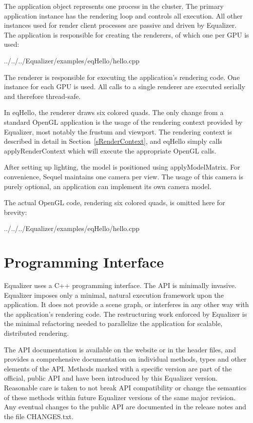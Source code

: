 \documentclass[10pt,a4]{scrartcl}
\newcommand{\sref}[1]{Section~\ref{#1}}
\begin{document}
The application object represents one process in the cluster. The primary
application instance has the rendering loop and controls all execution. All
other instances used for render client processes are passive and driven by
Equalizer. The application is responsible for creating the renderers, of which
one per GPU is used:

{\footnotesize
  {../../../Equalizer/examples/eqHello/hello.cpp}}

The renderer is responsible for executing the application's rendering code. One
instance for each GPU is used. All calls to a single renderer are executed
serially and therefore thread-safe.

In \textsf{eqHello}, the renderer draws six colored quads. The only change from
a standard OpenGL application is the usage of the rendering context provided by
Equalizer, most notably the frustum and viewport. The rendering context is
described in detail in \sref{sRenderContext}, and \textsf{eqHello} simply calls
\textsf{applyRenderContext} which will execute the appropriate OpenGL calls.

After setting up lighting, the model is positioned using
\textsf{applyModelMatrix}. For convenience, Sequel maintains one camera per
view. The usage of this camera is purely optional, an application can implement
its own camera model.

The actual OpenGL code, rendering six colored quads, is omitted here for
brevity:

{\footnotesize
  {../../../Equalizer/examples/eqHello/hello.cpp}}


\section{Programming Interface}

Equalizer uses a C++ programming interface. The API is minimally
invasive. Equalizer imposes only a minimal, natural execution framework upon the
application. It does not provide a scene graph, or interferes in any other way
with the application's rendering code. The restructuring work enforced by
Equalizer is the minimal refactoring needed to parallelize the application for
scalable, distributed rendering.

The API documentation is available on the website or in the header files, and
provides a comprehensive documentation on individual methods, types and other
elements of the API. Methods marked with a specific version are part of the
official, public API and have been introduced by this Equalizer
version. Reasonable care is taken to not break API compatibility or change the
semantics of these methods within future Equalizer versions of the same major
revision. Any eventual changes to the public API are documented in the release
notes and the file \textsf{CHANGES.txt}.
\end{document}
